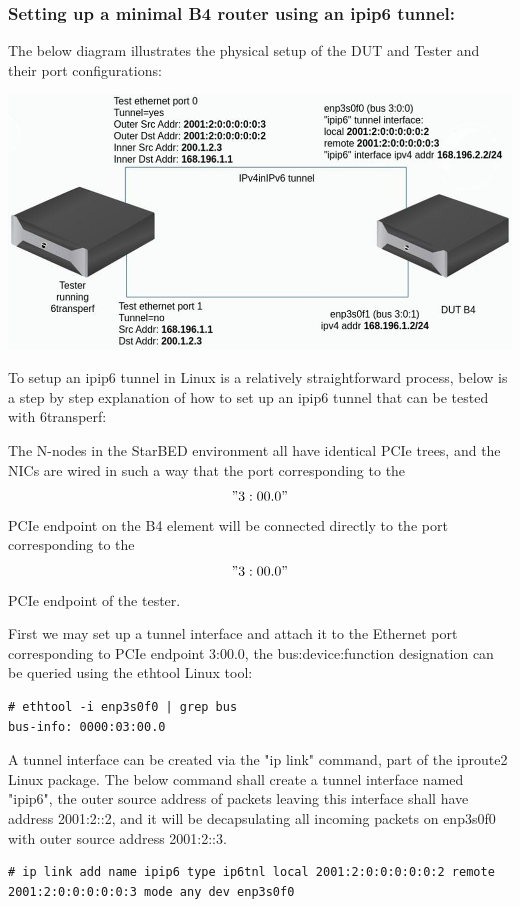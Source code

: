 \documentclass[a4paper,12p,titlepage]{article}
\begin{document}
\subsubsection{Setting up a minimal B4 router using an ipip6 tunnel:}

The below diagram illustrates the physical setup of the DUT and Tester and their port configurations:

\includegraphics[width=\textwidth]{minimal}

To setup an ipip6 tunnel in Linux is a relatively straightforward process, below is a step by step explanation of how to set up an ipip6 tunnel that can be tested with 6transperf:

The N-nodes in the StarBED environment all have identical PCIe trees, and the NICs are wired in such a way that the port corresponding to the $$"3:00.0"$$ PCIe endpoint on the B4 element will be connected directly to the port corresponding to the $$"3:00.0"$$ PCIe endpoint of the tester.

First we may set up a tunnel interface and attach it to the Ethernet port corresponding to PCIe endpoint 3:00.0, the bus:device:function designation can be queried using the ethtool Linux tool:

\begin{lstlisting}
# ethtool -i enp3s0f0 | grep bus
bus-info: 0000:03:00.0
\end{lstlisting}


A tunnel interface can be created via the "ip link" command, part of the iproute2 Linux package. The below command shall create a tunnel interface named "ipip6", the outer source address of packets leaving this interface shall have address 2001:2::2, and it will be decapsulating all incoming packets on enp3s0f0 with outer source address 2001:2::3.

\begin{lstlisting}
# ip link add name ipip6 type ip6tnl local 2001:2:0:0:0:0:0:2 remote 2001:2:0:0:0:0:0:3 mode any dev enp3s0f0
\end{lstlisting}
\end{document}
